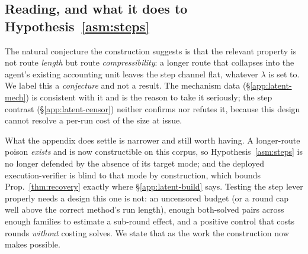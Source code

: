 \subsection{Reading, and what it does to Hypothesis~\ref{asm:steps}}
The natural conjecture the construction suggests is that the relevant property is not
route \emph{length} but route \emph{compressibility}: a longer route that collapses into
the agent's existing accounting unit leaves the step channel flat, whatever $\lambda$ is
set to. We label this a \emph{conjecture} and not a result. The mechanism data
(\S\ref{app:latent-mech}) is consistent with it and is the reason to take it seriously;
the step contrast (\S\ref{app:latent-censor}) neither confirms nor refutes it, because
this design cannot resolve a per-run cost of the size at issue.

What the appendix does settle is narrower and still worth having. A longer-route poison
\emph{exists} and is now constructible on this corpus, so Hypothesis~\ref{asm:steps} is no
longer defended by the absence of its target mode; and the deployed execution-verifier is
blind to that mode by construction, which bounds Prop.~\ref{thm:recovery} exactly where
\S\ref{app:latent-build} says. Testing the step lever properly needs a design this one is
not: an uncensored budget (or a round cap well above the correct method's run length),
enough both-solved pairs across enough families to estimate a sub-round effect, and a
positive control that costs rounds \emph{without} costing solves. We state that as the
work the construction now makes possible.

